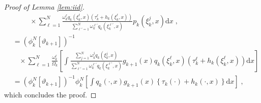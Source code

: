 \documentclass[12pt]{article}
\newcommand{\rmd}{\mathrm{d}}
\newcommand{\eqsp}{\;}
\newcommand{\1}{\mathrm{1}}
\newcommand{\qk}{q_{k}}
\begin{document}
\begin{proof}[Proof of Lemma \ref{lem:iid}]
\begin{align*}
&\hspace{1cm}\times \sum_{\ell=1}^N\frac{\omega_k^{\ell} \qk (\xi_{k}^{\ell},x)\left(\tau^{\ell}_k + h_{k}(\xi_{k}^{\ell},x)\right)}{\sum_{\ell'=1}^N\omega_k^{\ell'}\qk(\xi_{k}^{\ell'},x)}p_{k}(\xi_{k}^{j},x)\rmd x\eqsp,\\
&= \left(\phi^N_{k}[\vartheta_{k+1}]\right)^{-1}\\
&~~~~\times\sum_{\ell=1}^N \frac{\omega_k^\ell}{\Omega_k}\left[\int \frac{ \sum_{j=1}^N \omega_k^j\qk(\xi_k^j,x) }{ \sum_{\ell'=1}^N\omega_k^{\ell'}\qk(\xi_{k}^{\ell'},x) } g_{k+1}(x)\qk (\xi_{k}^{\ell},x)\left(\tau^{\ell}_k + h_{k}(\xi_{k}^{\ell},x)\right) \rmd x \right]\\ 
& =\left(\phi^N_{k}[\vartheta_{k+1}]\right)^{-1}\phi^N_{k}\left[\int \qk(\cdot,x)g_{k+1}(x)\left\{\tau_k(\cdot) + h_{k}(\cdot,x)\right\}\rmd x\right]\eqsp,
\end{align*}
which concludes the proof.
\end{proof}
\end{document}
